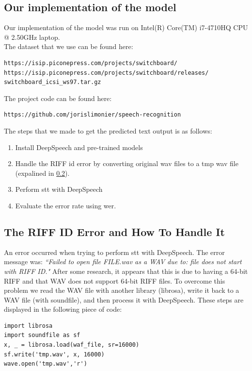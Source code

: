 \documentclass[12pt]{article}
\begin{document}
\subsection{Our implementation of the model}
Our implementation of the model was run on Intel(R) Core(TM) i7-4710HQ CPU @ 2.50GHz laptop. \\
The dataset that we use can be found here:
\begin{verbatim}
https://isip.piconepress.com/projects/switchboard/
https://isip.piconepress.com/projects/switchboard/releases/
switchboard_icsi_ws97.tar.gz
\end{verbatim}
The project code can be found here:
\begin{verbatim}
https://github.com/jorislimonier/speech-recognition
\end{verbatim}
The steps that we made to get the predicted text output is as follows:
\begin{enumerate}
    \item Install DeepSpeech and pre-trained models
    \item Handle the RIFF id error by converting original wav files to a tmp wav file (expalined in \ref{riff error}).
    \item Perform \gls{stt} with DeepSpeech
    \item Evaluate the error rate using \gls{wer}.
\end{enumerate}

\subsection{The RIFF ID Error and How To Handle It}
\label{riff error}
An error occurred when trying to perform \gls{stt} with DeepSpeech. The error message was: \textit{ ``Failed to open file FILE.wav as a WAV due to: file does not start with RIFF ID."} After some research, it appears that this is due to having a 64-bit RIFF and that WAV does not support 64-bit RIFF files. To overcome this problem we read the WAV file with another library (librosa), write it back to a  WAV file (with soundfile), and then process it with DeepSpeech. These steps are displayed in the following piece of code:
\begin{verbatim}
import librosa
import soundfile as sf
x, _ = librosa.load(waf_file, sr=16000)
sf.write('tmp.wav', x, 16000)
wave.open('tmp.wav','r')
\end{verbatim}
\end{document}
